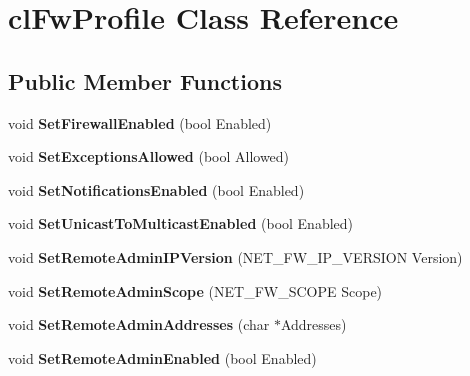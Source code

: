 \hypertarget{classcl_fw_profile}{
\section{clFwProfile Class Reference}
\label{classcl_fw_profile}
}
\subsection*{Public Member Functions}
\begin{DoxyCompactItemize}
\item 
\hypertarget{classcl_fw_profile_ac3e67aef65b20b32bdb66283b35317ed}{
void {\bfseries SetFirewallEnabled} (bool Enabled)}
\label{classcl_fw_profile_ac3e67aef65b20b32bdb66283b35317ed}

\item 
\hypertarget{classcl_fw_profile_ad1e40de6488aea66d7e8d1bc194d357a}{
void {\bfseries SetExceptionsAllowed} (bool Allowed)}
\label{classcl_fw_profile_ad1e40de6488aea66d7e8d1bc194d357a}

\item 
\hypertarget{classcl_fw_profile_a4b4db235743b526da8acc0bdcc9f2d1e}{
void {\bfseries SetNotificationsEnabled} (bool Enabled)}
\label{classcl_fw_profile_a4b4db235743b526da8acc0bdcc9f2d1e}

\item 
\hypertarget{classcl_fw_profile_a8aeff5260418173f9f3576ca9849ee21}{
void {\bfseries SetUnicastToMulticastEnabled} (bool Enabled)}
\label{classcl_fw_profile_a8aeff5260418173f9f3576ca9849ee21}

\item 
\hypertarget{classcl_fw_profile_ad28f0754e55900d12b3024ae00171bda}{
void {\bfseries SetRemoteAdminIPVersion} (NET\_\-FW\_\-IP\_\-VERSION Version)}
\label{classcl_fw_profile_ad28f0754e55900d12b3024ae00171bda}

\item 
\hypertarget{classcl_fw_profile_a1bf5f92deb4cc1fc6f54a0c1151523ab}{
void {\bfseries SetRemoteAdminScope} (NET\_\-FW\_\-SCOPE Scope)}
\label{classcl_fw_profile_a1bf5f92deb4cc1fc6f54a0c1151523ab}

\item 
\hypertarget{classcl_fw_profile_a53bfe02e1df2c6ba75ad55e3c3e44307}{
void {\bfseries SetRemoteAdminAddresses} (char $\ast$Addresses)}
\label{classcl_fw_profile_a53bfe02e1df2c6ba75ad55e3c3e44307}

\item 
\hypertarget{classcl_fw_profile_abf2494cb7fee867a459890b2ddbc7e0d}{
void {\bfseries SetRemoteAdminEnabled} (bool Enabled)}
\label{classcl_fw_profile_abf2494cb7fee867a459890b2ddbc7e0d}


\end{DoxyCompactItemize}
